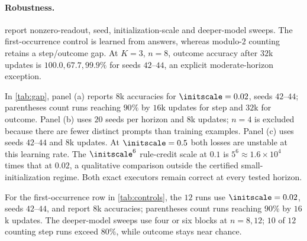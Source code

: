 \paragraph{Robustness.}  report nonzero-readout, seed, initialization-scale and deeper-model sweeps.
The first-occurrence control is learned from answers, whereas modulo-$2$ counting retains a step/outcome gap.
At $K=3$, $n=8$, outcome accuracy after $32$k updates is $100.0,67.7,99.9\%$ for seeds $42$--$44$,
an explicit moderate-horizon exception.

In \cref{tab:gap}, panel (a) reports $8$k accuracies for $\initscale=0.02$, seeds $42$--$44$; parentheses count runs reaching
$90\%$ by $16$k updates for step and $32$k for outcome. Panel (b) uses $20$ seeds per horizon and $8$k updates;
$n=4$ is excluded because there are fewer distinct prompts than training examples. Panel (c) uses seeds $42$--$44$ and $8$k updates.
At $\initscale=0.5$ both losses are unstable at this learning rate. The $\initscale^6$ rule-credit scale at $0.1$ is
$5^6\approx1.6\times10^4$ times that at $0.02$, a qualitative comparison outside the certified small-initialization regime.
Both exact executors remain correct at every tested horizon.

For the first-occurrence row in \cref{tab:controls}, the $12$ runs use $\initscale=0.02$, seeds $42$--$44$, and report $8$k accuracies;
parentheses count runs reaching $90\%$ by $16$k updates. The deeper-model sweeps use four or six blocks at $n=8,12$;
$10$ of $12$ counting step runs exceed $80\%$, while outcome stays near chance.

